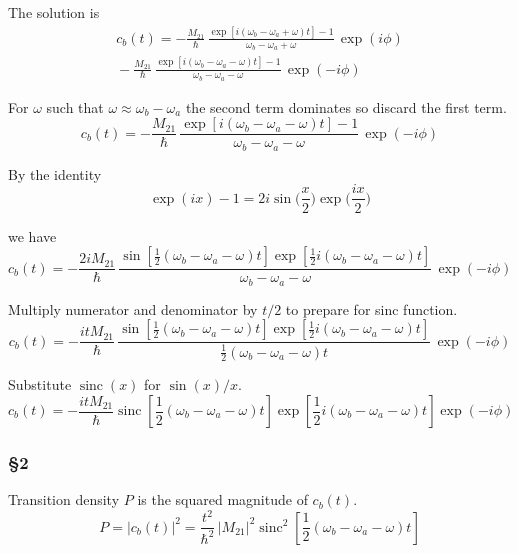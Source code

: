 The solution is
\begin{multline*}
c_b(t)
=-\frac{M_{21}}{\hbar}
\,
\frac{\exp[i(\omega_b-\omega_a+\omega) t]-1}{\omega_b-\omega_a+\omega}
\,
\exp(i\phi)
\\{}-\frac{M_{21}}{\hbar}
\,
\frac{\exp[i(\omega_b-\omega_a-\omega) t]-1}{\omega_b-\omega_a-\omega}
\,
\exp(-i\phi)
\tag{2}
\end{multline*}

For $\omega$ such that $\omega\approx\omega_b-\omega_a$ the second term
dominates so discard the first term.
\begin{equation*}
c_b(t)=-\frac{M_{21}}{\hbar}
\,
\frac{\exp[i(\omega_b-\omega_a-\omega) t]-1}{\omega_b-\omega_a-\omega}
\,
\exp(-i\phi)
\end{equation*}

By the identity
\begin{equation*}
\exp(ix)-1=2i\sin\biggl(\frac{x}{2}\biggr)\exp\biggl(\frac{ix}{2}\biggr)
\tag{3}
\end{equation*}

we have
\begin{equation*}
c_b(t)=-\frac{2iM_{21}}{\hbar}
\,
\frac{
\sin\left[\frac{1}{2}(\omega_b-\omega_a-\omega)t\right]
\exp\left[\frac{1}{2}i(\omega_b-\omega_a-\omega)t\right]
}{\omega_b-\omega_a-\omega}
\,
\exp(-i\phi)
\end{equation*}

Multiply numerator and denominator by $t/2$ to prepare for sinc function.
\begin{equation*}
c_b(t)=-\frac{itM_{21}}{\hbar}
\,
\frac{
\sin\left[\frac{1}{2}(\omega_b-\omega_a-\omega)t\right]
\exp\left[\frac{1}{2}i(\omega_b-\omega_a-\omega)t\right]
}{\frac{1}{2}(\omega_b-\omega_a-\omega)t}
\,
\exp(-i\phi)
\end{equation*}

Substitute $\operatorname{sinc}(x)$ for $\sin(x)/x$.
\begin{equation*}
c_b(t)=-\frac{itM_{21}}{\hbar}
\operatorname{sinc}\left[\frac{1}{2}(\omega_b-\omega_a-\omega)t\right]
\exp\left[\frac{1}{2}i(\omega_b-\omega_a-\omega)t\right]
\exp(-i\phi)
\tag{4}
\end{equation*}

\subsubsection*{\S2}

Transition density $P$ is the squared magnitude of $c_b(t)$.
\begin{equation*}
P=|c_b(t)|^2=\frac{t^2}{\hbar^2}\,|M_{21}|^2
\operatorname{sinc}^2\left[\frac{1}{2}(\omega_b-\omega_a-\omega)t\right]
\tag{5}
\end{equation*}

